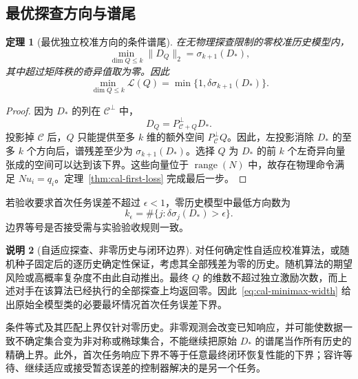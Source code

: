 \documentclass[11pt,a4paper]{article}
\numberwithin{equation}{section}
\newtheorem{theorem}{定理}[section]
\theoremstyle{definition}
\newtheorem{remark}[theorem]{说明}
\begin{document}
\subsection{最优探查方向与谱尾}

\begin{theorem}[最优独立校准方向的条件谱尾]
\label{thm:cal-width}
在无物理探查限制的零校准历史模型内，
\begin{equation}
  \min_{\dim Q\le k}\|D_Q\|_2
  =\sigma_{k+1}(D_*),
  \label{eq:cal-quotient-width}
\end{equation}
其中超过矩阵秩的奇异值取为零。因此
\begin{equation}
  \boxed{
  \min_{\dim Q\le k}\mathcal L(Q)
  =\min\{1,\delta\sigma_{k+1}(D_*)\}.}
  \label{eq:cal-minimax-width}
\end{equation}
\end{theorem}

\begin{proof}
因为 $D_*$ 的列在 $\mathcal C^\perp$ 中，
\begin{equation}
  D_Q=P_{\mathcal C+Q}^\perp D_* .
\end{equation}
投影掉 $\mathcal C$ 后，$Q$ 只能提供至多 $k$ 维的额外空间 $P_{\mathcal C}^\perp Q$。因此，左投影消除 $D_*$ 的至多 $k$ 个方向后，谱残差至少为 $\sigma_{k+1}(D_*)$。选择 $Q$ 为 $D_*$ 的前 $k$ 个左奇异向量张成的空间可以达到该下界。这些向量位于 $\operatorname{range}(N)$ 中，故存在物理命令满足 $Nu_i=q_i$。定理~\ref{thm:cal-first-loss} 完成最后一步。
\end{proof}

若验收要求首次任务误差不超过 $\epsilon<1$，零历史模型中最低方向数为
\begin{equation}
  k_\epsilon=
  \#\{j:\delta\sigma_j(D_*)>\epsilon\}.
  \label{eq:cal-epsilon-dimension}
\end{equation}
边界等号是否接受需与实验验收规则一致。

\begin{remark}[自适应探查、非零历史与闭环边界]
\label{rem:cal-width-scope}
对任何确定性自适应校准算法，或随机种子固定后的逐历史确定性保证，考虑其全部残差为零的历史。随机算法的期望风险或高概率复杂度不由此自动推出。最终 $Q$ 的维数不超过独立激励次数，而上述对手在该算法已经执行的全部探查上均返回零。因此~\eqref{eq:cal-minimax-width} 给出原始全模型类的必要最坏情况首次任务误差下界。

条件等式及其匹配上界仅针对零历史。非零观测会改变已知响应，并可能使数据一致不确定集合变为非对称或椭球集合，不能继续把原始 $D_*$ 的谱尾当作所有历史的精确上界。此外，首次任务响应下界不等于任意最终闭环恢复性能的下界；容许等待、继续适应或接受暂态误差的控制器解决的是另一个任务。
\end{remark}
\end{document}

